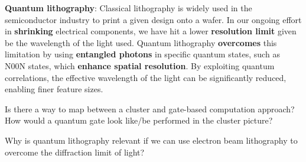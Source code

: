 \documentclass{alex_summary}
\begin{document}
\textbf{Quantum lithography}: Classical lithography is widely used in the semiconductor industry to print a given design onto a wafer. In our ongoing effort in \textbf{shrinking} electrical components, we have hit a lower \textbf{resolution limit} given be the wavelength of the light used. Quantum lithography \textbf{overcomes} this limitation by using \textbf{entangled photons} in specific quantum states, such as N00N states, which \textbf{enhance spatial resolution}. By exploiting quantum correlations, the effective wavelength of the light can be significantly reduced, enabling finer feature sizes.


\begin{question1}
	Is there a way to map between a cluster and gate-based computation approach? How would a quantum gate look like/be performed in the cluster picture?
\end{question1}


\begin{question3}
	Why is quantum lithography relevant if we can use electron beam lithography to overcome the diffraction limit of light?
\end{question3}

\printbibliography
\end{document}
